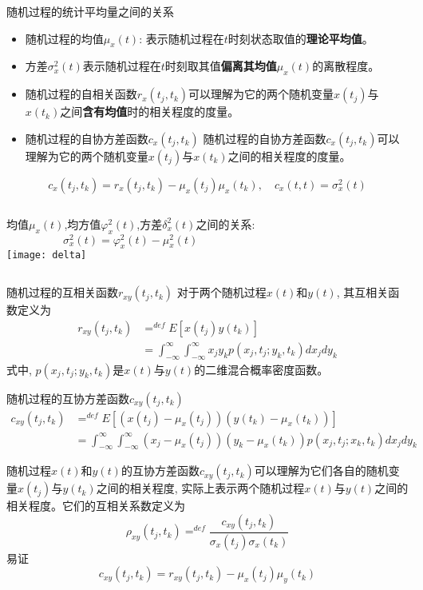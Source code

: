 \begin{frame}{随机过程的统计平均量之间的关系}
\begin{itemize}
	\item 随机过程的均值$\mu_x(t)$: 表示随机过程在$t$时刻状态取值的\textbf{理论平均值}。
	\item 方差$\sigma_x^2(t)$表示随机过程在$t$时刻取其值\textbf{偏离其均值}$\mu_x(t)$的离散程度。
	\item 随机过程的自相关函数$r_x(t_j,t_k)$可以理解为它的两个随机变量$x(t_j)$与$x(t_k)$之间\textbf{含有均值}时的相关程度的度量。
	\item 随机过程的自协方差函数$c_x(t_j,t_k)$
	随机过程的自协方差函数$c_x(t_j,t_k)$可以理解为它的两个随机变量$x(t_j)$与$x(t_k)$之间的相关程度的度量。
\end{itemize}
\[c_x(t_j,t_k)=r_x(t_j,t_k)-\mu_x(t_j)\mu_x(t_k),\quad c_x(t,t)=\sigma_x^2(t)\]
\begin{columns}
	均值$\mu_x(t)$,均方值$\varphi_x^2(t)$,方差$\delta_x^2(t)$之间的关系:
	\[\sigma_x^2(t)=\varphi_x^2(t)-\mu_x^2(t)\]
	\texttt{[image: delta]}
\end{columns}
\end{frame}

\begin{frame}
\begin{block}{随机过程的互相关函数$r_{xy}(t_j,t_k)$}
对于两个随机过程$x(t)$和$y(t)$, 其互相关函数定义为
\begin{align*}
r_{xy}(t_j,t_k) &\mathop{=}^{def}E[x(t_j)y(t_k)]\\
&=\int_{-\infty}^{\infty}\int_{-\infty}^{\infty}x_jy_kp(x_j,t_j;y_k,t_k)dx_jdy_k
\end{align*}
式中, $p(x_j,t_j;y_k,t_k)$是$x(t)$与$y(t)$的二维混合概率密度函数。
\end{block}
\end{frame}

\begin{frame}
\begin{block}{随机过程的互协方差函数$c_{xy}(t_j,t_k)$}
\begin{align*}
c_{xy}(t_j,t_k)&\mathop{=}^{def}E[(x(t_j)-\mu_x(t_j))(y(t_k)-\mu_x(t_k))]\\
&=\int_{-\infty}^{\infty}\int_{-\infty}^{\infty}(x_j-\mu_x(t_j))(y_k-\mu_x(t_k))p(x_j,t_j;x_k,t_k)dx_jdy_k
\end{align*}
\end{block}
随机过程$x(t)$和$y(t)$的互协方差函数$c_{xy}(t_j,t_k)$可以理解为它们各自的随机变量$x(t_j)$与$y(t_k)$之间的相关程度, 实际上表示两个随机过程$x(t)$与$y(t)$之间的相关程度。它们的互相关系数定义为
\[\rho_{xy}(t_j,t_k)\mathop{=}^{def}\frac{c_{xy}(t_j,t_k)}{\sigma_x(t_j)\sigma_x(t_k)}\]
易证
\[c_{xy}(t_j,t_k)=r_{xy}(t_j,t_k)-\mu_x(t_j)\mu_y(t_k)\]
\end{frame}

